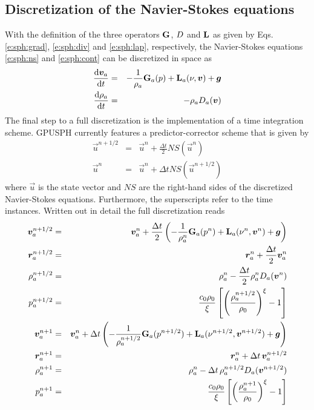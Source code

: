 \subsection{Discretization of the Navier-Stokes equations}
With the definition of the three operators $\textbf{G}$, $D$ and $\textbf{L}$ as
given by Eqs. \eqref{e:sph:grad}, \eqref{e:sph:div} and
\eqref{e:sph:lap}, respectively, the Navier-Stokes equations
\eqref{e:sph:ns} and \eqref{e:sph:cont} can be discretized in space as
\begin{eqnarray}
\frac{\text{d} \bm{v}_a}{\text{d} t} &=& - \frac{1}{\rho_a}\textbf{G}_a(p) +
\textbf{L}_a(\nu,\bm{v}) + \bm{g}
\label{e:sph:ns-disc}
\\
\frac{\text{d} \rho_a}{\text{d} t} &=& -\rho_a D_a(\bm{v})
\label{e:sph:cont-disc}
\end{eqnarray}
The final step to a full discretization is the implementation of a time
integration scheme. GPUSPH currently features a predictor-corrector
scheme that is given by
\begin{eqnarray}
\vec{u}^{n+1/2} &=& \vec{u}^n + \frac{\Delta t}{2} NS(\vec{u}^n)
\label{e:sph:pred-corr}
\\
\vec{u}^{n} &=& \vec{u}^n + \Delta t NS(\vec{u}^{n+1/2})
\nonumber
\end{eqnarray}
where $\vec{u}$ is the state vector and $NS$ are the right-hand sides
of the discretized Navier-Stokes equations. Furthermore, the
superscripts refer to the time instances. Written out in detail
the full discretization reads
\begin{eqnarray}
\bm{v}_a^{n+1/2} &=& \bm{v}_a^n + \frac{\Delta t}{2} \left(
-\frac{1}{\rho^n_a}\textbf{G}_a(p^n) + \textbf{L}_a(\nu^n,\bm{v}^n) + \bm{g}
\right)
\label{e:sph:pred-corr-ns}
\\
\bm{r}_a^{n+1/2} &=& \bm{r}_a^{n} + \frac{\Delta t}{2}
\bm{v}_a^{n}
\nonumber
\\
\rho_a^{n+1/2} &=& \rho_a^n - \frac{\Delta t}{2} \rho_a^n
D_a(\bm{v}^n)
\nonumber
\\
p_a^{n+1/2} &=& \frac{c_0 \rho_0}{\xi}\left[ \left( \frac{\rho_a^{n+1/2}}{\rho_0}\right)^\xi
-1 \right]
\nonumber
\\
\bm{v}_a^{n+1} &=& \bm{v}_a^n + \Delta t \left(
-\frac{1}{\rho^{n+1/2}_a}\textbf{G}_a(p^{n+1/2}) +
\textbf{L}_a(\nu^{n+1/2},\bm{v}^{n+1/2}) + \bm{g}
\right)
\nonumber
\\
\bm{r}_a^{n+1} &=& \bm{r}_a^{n} + \Delta t\,
\bm{v}_a^{n+1/2}
\nonumber
\\
\rho_a^{n+1} &=& \rho_a^n - \Delta t\, \rho_a^{n+1/2}
D_a(\bm{v}^{n+1/2})
\nonumber
\\
p_a^{n+1} &=& \frac{c_0 \rho_0}{\xi}\left[ \left( \frac{\rho_a^{n+1}}{\rho_0}\right)^\xi
-1 \right]
\nonumber
\end{eqnarray}

